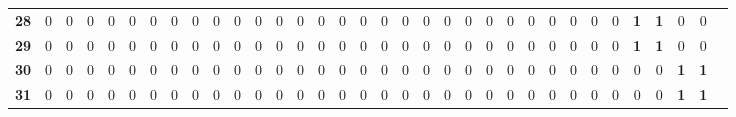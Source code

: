 \documentclass[runningheads, a4paper, 10pt]{llncs}
\begin{document}
{\begin{longtabu}{cccccccccccccccccccccccccccccccccc}
\bf{28} & 0 & 0 & 0 & 0 & 0 & 0 & 0 & 0 & 0 & 0 & 0 & 0 & 0 & 0 & 0 & 0 & 0 & 0 & 0 & 0 & 0 & 0 & 0 & 0 & 0 & 0 & 0 & 0 & \bf1 & \bf1 & 0  & 0\\
\bf{29} & 0 & 0 & 0 & 0 & 0 & 0 & 0 & 0 & 0 & 0 & 0 & 0 & 0 & 0 & 0 & 0 & 0 & 0 & 0 & 0 & 0 & 0 & 0 & 0 & 0 & 0 & 0 & 0 & \bf1 & \bf1 & 0  & 0\\
\bf{30} & 0 & 0 & 0 & 0 & 0 & 0 & 0 & 0 & 0 & 0 & 0 & 0 & 0 & 0 & 0 & 0 & 0 & 0 & 0 & 0 & 0 & 0 & 0 & 0 & 0 & 0 & 0 & 0 & 0 & 0 & \bf1  & \bf1\\
\bf{31} & 0 & 0 & 0 & 0 & 0 & 0 & 0 & 0 & 0 & 0 & 0 & 0 & 0 & 0 & 0 & 0 & 0 & 0 & 0 & 0 & 0 & 0 & 0 & 0 & 0 & 0 & 0 & 0 & 0 & 0 & \bf1  & \bf1\\

\end{longtabu}
}
\end{document}
